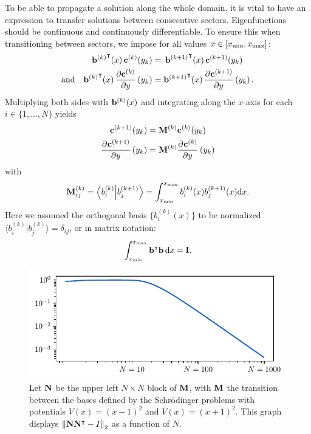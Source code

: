 To be able to propagate a solution along the whole domain, it is vital to have an expression to transfer solutions between consecutive sectors. Eigenfunctions should be continuous and continuously differentiable. To ensure this when transitioning between sectors, we impose for all values $x \in [{x_{\text{min}}}, {x_{\text{max}}}]$:
\begin{align*}
  {\vb{b}^{(k)}}^\intercal(x) \, \vb{c}^{(k)}(y_k)                   & =\, {\vb{b}^{(k+1)}}^\intercal(x) \, \vb{c}^{(k+1)}(y_k)                            \\
  \text{and}\quad
  {\vb{b}^{(k)}}^\intercal(x)\,\pdv{\vb{c}^{(k)}}{y}\left(y_k\right) & = {\vb{b}^{(k+1)}}^\intercal(x)\,\pdv[]{\vb{c}^{(k+1)}}{y}\left(y_k\right) \text{.}
\end{align*}
Multiplying both sides with $\vb{b}^{(k)}(x)$ and integrating along the $x$-axis for each $i \in \{1, \dots, N\}$ yields
\begin{align*}
  \vb{c}^{(k+1)}(y_k)                       & = \vb{M}^{(k)} \vb{c}^{(k)}(y_k)                       \\
  \pdv[]{\vb{c}^{(k+1)}}{y}\left(y_k\right) & = \vb{M}^{(k)} \pdv[]{\vb{c}^{(k)}}{y}\left(y_k\right)
\end{align*}
with
$$
  \vb{M}^{(k)}_{ij} = \bra{b_{i}^{(k)}}\ket{b_{j}^{(k+1)}} = \int_{x_{\text{min}}}^{x_{\text{max}}} b_i^{(k)}(x) b_j^{(k+1)}(x) \dd x \text{.}
$$
Here we assumed the orthogonal basis $\{b_i^{(k)}(x)\}$ to be normalized $\langle b_{i}^{(k)} | b_{j}^{(k)} \rangle = \delta_{ij}$, or in matrix notation:
\begin{equation}\label{equ:c3_b_orthonormal}
  \int_{x_{\text{min}}}^{x_{\text{max}}} {\vb{b}}^\intercal \vb{b}\,\dd x = \vb{I}\text{.}
\end{equation}

\begin{figure}
  \begin{center}
    \includegraphics[width=\textwidth]{img/chapter3/orthogonal_m.pdf}
  \end{center}
  \caption{Let $\vb{N}$ be the upper left $N \times N$ block of $\vb{M}$, with $\vb{M}$ the transition between the bases defined by the Schrödinger problems with potentials $V(x) = (x-1)^2$ and $V(x) = (x+1)^2$. This graph displays $\left\| \vb{N} {\vb{N}}^\intercal - I \right\|_2$ as a function of $N$.}\label{fig:c3_orthogonal_m}
\end{figure}

